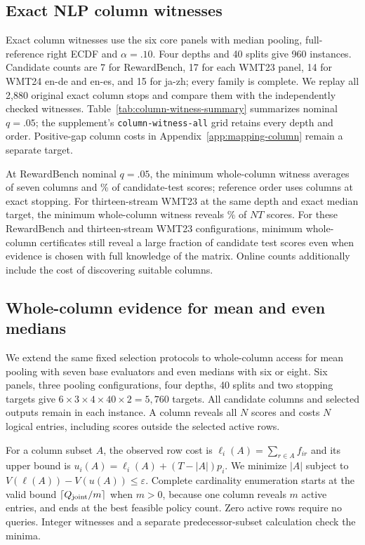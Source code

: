 \subsection{Exact NLP column witnesses}
Exact column witnesses use the six core panels with median pooling, full-reference right ECDF and $\alpha=.10$. Four depths and 40 splits give 960 instances. Candidate counts are 7 for RewardBench, 17 for each WMT23 panel, 14 for WMT24 en-de and en-es, and 15 for ja-zh; every family is complete. We replay all 2,880 original exact column stops and compare them with the independently checked witnesses. Table~\ref{tab:column-witness-summary} summarizes nominal $q=.05$; the supplement's \texttt{column-witness-all} grid retains every depth and order. Positive-gap column costs in Appendix~\ref{app:mapping-column} remain a separate target.

At RewardBench nominal $q=.05$, the minimum whole-column witness averages \granRbColumns{} of seven columns and \granRbMinimum\% of candidate-test scores; reference order uses \granRbOnlineColumns{} columns at exact stopping. For thirteen-stream WMT23 at the same depth and exact median target, the minimum whole-column witness reveals \granWmtMinimum\% of $NT$ scores. For these RewardBench and thirteen-stream WMT23 configurations, minimum whole-column certificates still reveal a large fraction of candidate test scores even when evidence is chosen with full knowledge of the matrix. Online counts additionally include the cost of discovering suitable columns.


\subsection{Whole-column evidence for mean and even medians}
\label{app:mean-even-columns}
We extend the same fixed selection protocols to whole-column access for mean pooling with seven base evaluators and even medians with six or eight. Six panels, three pooling configurations, four depths, 40 splits and two stopping targets give $6\times3\times4\times40\times2=5{,}760$ targets. All candidate columns and selected outputs remain in each instance. A column reveals all $N$ scores and costs $N$ logical entries, including scores outside the selected active rows.

For a column subset $A$, the observed row cost is $\ell_i(A)=\sum_{r\in A}f_{ir}$ and its upper bound is $u_i(A)=\ell_i(A)+(T-|A|)p_i$. We minimize $|A|$ subject to $V(\ell(A))-V(u(A))\le\varepsilon$. Complete cardinality enumeration starts at the valid bound $\lceil Q_{\rm joint}/m\rceil$ when $m>0$, because one column reveals $m$ active entries, and ends at the best feasible policy count. Zero active rows require no queries. Integer witnesses and a separate predecessor-subset calculation check the minima.

